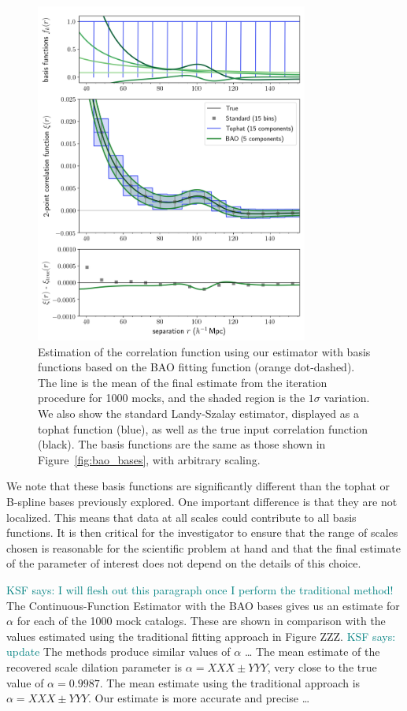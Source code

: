\documentclass[modern]{aastex62}
\newcommand{\Est}{The Continuous-Function Estimator\xspace}
\newcommand{\KSF}[1]{\textcolor{teal}{KSF says: #1}}
\begin{document}
\label{fig:bao}
\begin{figure}[th]
\centering
    \includegraphics[width=0.8\textwidth]{xicomparison_2e-4_tophat8_baoiter}
    \caption{Estimation of the correlation function using our estimator with basis functions based on the BAO fitting function (orange dot-dashed). The line is the mean of the final estimate from the iteration procedure for 1000 mocks, and the shaded region is the $1\sigma$ variation. We also show the standard Landy-Szalay estimator, displayed as a tophat function (blue), as well as the true input correlation function (black). The basis functions are the same as those shown in Figure~\ref{fig:bao_bases}, with arbitrary scaling.}
\end{figure}

We note that these basis functions are significantly different than the tophat or B-spline bases previously explored.
One important difference is that they are not localized.
This means that data at all scales could contribute to all basis functions.
It is then critical for the investigator to ensure that the range of scales chosen is reasonable for the scientific problem at hand and that the final estimate of the parameter of interest does not depend on the details of this choice.

\KSF{I will flesh out this paragraph once I perform the traditional method!}
\Est with the BAO bases gives us an estimate for $\alpha$ for each of the 1000 mock catalogs.
These are shown in comparison with the values estimated using the traditional fitting approach in Figure ZZZ. \KSF{update} 
The methods produce similar values of $\alpha$ \dots 
The mean estimate of the recovered scale dilation parameter is $\alpha=XXX \pm YYY$, very close to the true value of $\alpha = 0.9987$.
The mean estimate using the traditional approach is $\alpha=XXX \pm YYY$.
Our estimate is more accurate and precise \dots 
\end{document}
